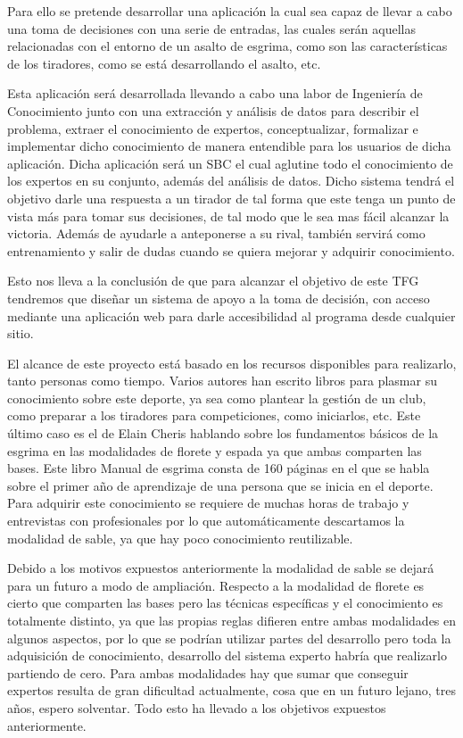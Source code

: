 Para ello se pretende desarrollar una aplicación la cual sea capaz de llevar a
 cabo una toma de decisiones con una serie de entradas, las cuales serán aquellas
 relacionadas con el entorno de un asalto de esgrima, como son las características
 de los tiradores, como se está desarrollando el asalto, etc.

Esta aplicación será desarrollada llevando a cabo una labor de Ingeniería de Conocimiento
 junto con una extracción y análisis de datos para describir el problema, extraer
 el conocimiento de expertos, conceptualizar, formalizar e implementar dicho conocimiento
 de manera entendible para los usuarios de dicha aplicación. Dicha aplicación será un SBC
 el cual aglutine todo el conocimiento de los expertos en su conjunto, además del análisis
 de datos. Dicho sistema tendrá el objetivo darle una respuesta a un tirador de tal forma
 que este tenga un punto de vista más para tomar sus decisiones, de tal modo que le sea mas
 fácil alcanzar la victoria. Además de ayudarle a anteponerse a su rival, también servirá
 como entrenamiento y salir de dudas cuando se quiera mejorar y adquirir conocimiento.

Esto nos lleva a la conclusión de que para alcanzar el objetivo de este TFG tendremos
 que diseñar un sistema de apoyo a la toma de decisión, con acceso mediante una aplicación
 web para darle accesibilidad al programa desde cualquier sitio.

El alcance de este proyecto está basado en los recursos disponibles para realizarlo, tanto personas como tiempo.
 Varios autores han escrito libros para plasmar su conocimiento sobre este deporte,
 ya sea como plantear la gestión de un club, como preparar a los tiradores para competiciones,
 como iniciarlos, etc. Este último caso es el de Elain Cheris hablando sobre los fundamentos
 básicos de la esgrima en las modalidades de florete y espada ya que ambas comparten
 las bases. Este libro Manual de esgrima consta de 160 páginas en el que se habla sobre
 el primer año de aprendizaje de una persona que se inicia en el deporte. Para adquirir
 este conocimiento se requiere de muchas horas de trabajo y entrevistas con profesionales
 por lo que automáticamente descartamos la modalidad de sable, ya que hay poco conocimiento
 reutilizable.

Debido a los motivos expuestos anteriormente la modalidad de sable se dejará para un futuro
 a modo de ampliación. Respecto a la modalidad de florete es cierto que comparten
 las bases pero las técnicas específicas y el conocimiento es totalmente distinto,
 ya que las propias reglas difieren entre ambas modalidades en algunos aspectos,
 por lo que se podrían utilizar partes del desarrollo pero toda la adquisición de
 conocimiento, desarrollo del sistema experto habría que realizarlo partiendo de cero.
 Para ambas modalidades hay que sumar que conseguir expertos resulta de gran dificultad
 actualmente, cosa que en un futuro lejano, tres años, espero solventar. Todo esto ha
 llevado a los objetivos expuestos anteriormente.

